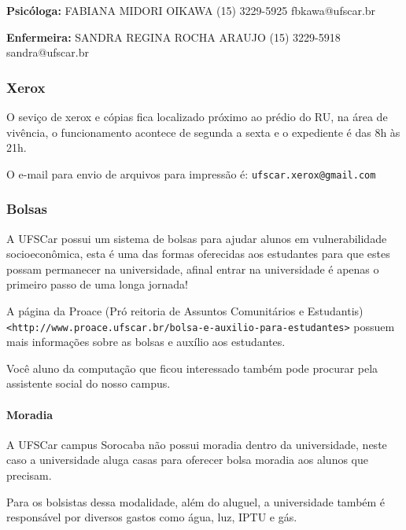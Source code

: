\begin{multicols}{2}
\noindent \textbf{Psicóloga:}
  \newline FABIANA MIDORI OIKAWA
  \newline (15) 3229-5925
  \newline fbkawa@ufscar.br

\noindent \textbf{Enfermeira:}
  \newline SANDRA REGINA ROCHA ARAUJO
  \newline (15) 3229-5918
  \newline sandra@ufscar.br

\end{multicols}

\subsubsection{Xerox}
O seviço de xerox e cópias fica localizado próximo ao prédio do RU, na área de vivência, o funcionamento acontece de segunda a sexta e o expediente é das 8h às 21h. 

O e-mail para envio de arquivos para impressão é: \texttt{ufscar.xerox@gmail.com}

\subsubsection{Bolsas}
A UFSCar possui um sistema de bolsas para ajudar alunos em vulnerabilidade socioeconômica, esta é uma das formas oferecidas aos estudantes para que estes possam permanecer na universidade, afinal entrar na universidade é apenas o primeiro passo de uma longa jornada!

A página da Proace (Pró reitoria de Assuntos Comunitários e Estudantis) \newline \texttt{<http://www.proace.ufscar.br/bolsa-e-auxilio-para-estudantes>} possuem mais informações sobre as bolsas e auxílio aos estudantes.

Você aluno da computação que ficou interessado também pode procurar pela assistente social do nosso campus.

\paragraph{Moradia}\label{moradia}
A UFSCar campus Sorocaba não possui moradia dentro da universidade, neste caso a universidade aluga casas para oferecer bolsa moradia aos alunos que precisam.

Para os bolsistas dessa modalidade, além do aluguel, a universidade também é responsável por diversos gastos como água, luz, IPTU e gás.

